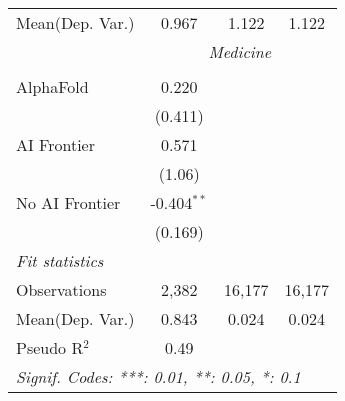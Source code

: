 \begin{tabular}{lccc}
Mean(Dep. Var.) & 0.967 & 1.122 & 1.122 \\
 & \multicolumn{3}{c}{\textit{Medicine}} \\ \\
   AlphaFold      & 0.220         &        &   \\   
                  & (0.411)       &        &   \\   
   AI Frontier    & 0.571         &        &   \\   
                  & (1.06)        &        &   \\   
   No AI Frontier & -0.404$^{**}$ &        &   \\   
                  & (0.169)       &        &   \\   
   \midrule
   \emph{Fit statistics}\\
   Observations   & 2,382         & 16,177 & 16,177\\  
Mean(Dep. Var.) & 0.843 & 0.024 & 0.024 \\
   Pseudo R$^2$   & 0.49          &        & \\  
   \midrule \midrule
   \multicolumn{4}{l}{\emph{Signif. Codes: ***: 0.01, **: 0.05, *: 0.1}}\\
\end{tabular}
\par\endgroup
